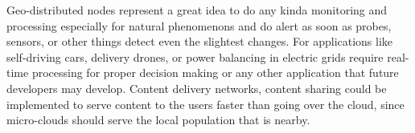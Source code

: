 Geo-distributed nodes represent a great idea to do any kinda monitoring and processing especially for natural phenomenons and do alert as soon as probes, sensors, or other things detect even the slightest changes. For applications like self-driving cars, delivery drones, or power balancing in electric grids require real-time processing for proper decision making or any other application that future developers may develop. Content delivery networks, content sharing could be implemented to serve content to the users faster than going over the cloud, since micro-clouds should serve the local population that is nearby.
%
%